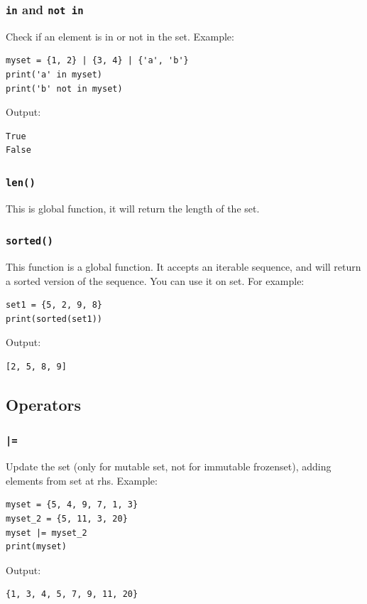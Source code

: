 \documentclass[12pt]{book}
\begin{document}
\subsubsection{\texttt{in} and \texttt{not in}}
\label{sec:org816067a}
Check if an element is in or not in the set. Example:
\begin{verbatim}
myset = {1, 2} | {3, 4} | {'a', 'b'}
print('a' in myset)
print('b' not in myset)
\end{verbatim}
Output:
\begin{verbatim}
True
False
\end{verbatim}
\subsubsection{\texttt{len()}}
\label{sec:org83899b4}
This is global function, it will return the length of the set.
\subsubsection{\texttt{sorted()}}
\label{sec:org79a7269}
This function is a global function. It accepts an iterable sequence, and will return a sorted version of the sequence. You can use it on set. For example:
\begin{verbatim}
set1 = {5, 2, 9, 8}
print(sorted(set1))
\end{verbatim}
Output:
\begin{verbatim}
[2, 5, 8, 9]
\end{verbatim}
\subsection{Operators}
\label{sec:org46899c7}
\subsubsection{\texttt{|=}}
\label{sec:orgadbe601}
Update the set (only for mutable set, not for immutable frozenset), adding elements from set at rhs. Example:
\begin{verbatim}
myset = {5, 4, 9, 7, 1, 3}
myset_2 = {5, 11, 3, 20}
myset |= myset_2
print(myset)
\end{verbatim}
Output:
\begin{verbatim}
{1, 3, 4, 5, 7, 9, 11, 20}
\end{verbatim}
\end{document}
